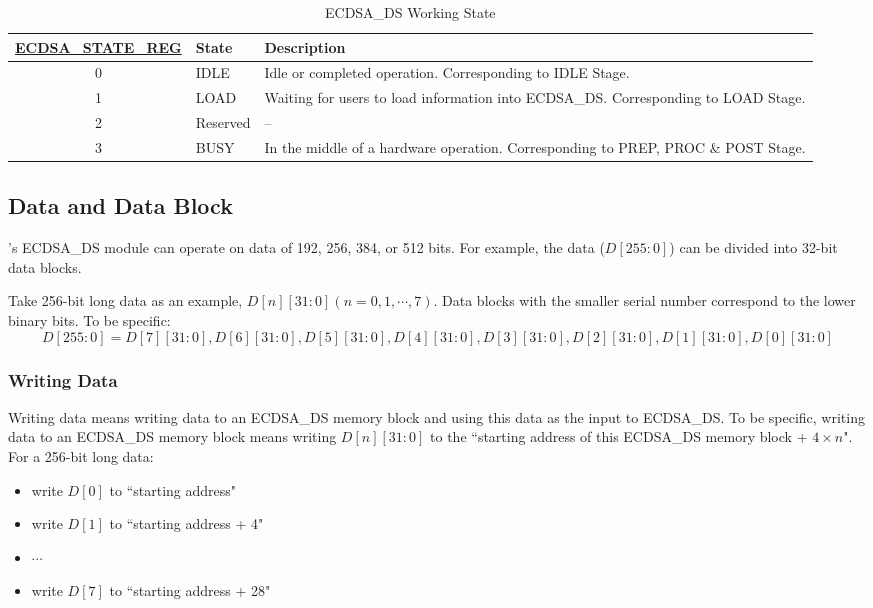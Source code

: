 \documentclass[main\_\_EN.tex]{subfiles}
\begin{document}
\begin{table}[H]
    \centering
    \caption{ECDSA\_DS Working State}
    \label{tab:ecdsa-working-state}
    \begin{tabular}{ | c | l | L{8cm} | }
    \hline
        \textbf{\hyperref[regdesc:ECDSASTATEREG]{ECDSA\_STATE\_REG}} & \textbf{State} &  \textbf{Description} \\     & IDLE      &   Idle or completed operation. Corresponding to IDLE Stage.\\     & LOAD      &   Waiting for users to load information into ECDSA\_DS. Corresponding to LOAD Stage.    \\     & Reserved      &  --    \\     & BUSY      &   In the middle of a hardware operation. Corresponding to PREP, PROC \& POST Stage.    \\ \hline
    \end{tabular}
\end{table}

\subsection{Data and Data Block}

\chipname{}'s ECDSA\_DS module can operate on data of 192, 256, 384, or 512 bits. For example, the data ($D[255:0]$) can be divided into 32-bit data blocks.

Take 256-bit long data as an example, $D[n][31:0] (n=0, 1, \cdots, 7)$. Data blocks with the smaller serial number correspond to the lower binary bits. To be specific:
\[
D[255:0] = {D[7][31:0],D[6][31:0],D[5][31:0],
D[4][31:0],D[3][31:0],D[2][31:0],D[1][31:0],D[0][31:0]}
\]

\subsubsection{Writing Data}

Writing data means writing data to an ECDSA\_DS memory block and using this data as the input to ECDSA\_DS. To be specific, writing data to an ECDSA\_DS memory block means writing $D[n][31:0]$ to the ``starting address of this ECDSA\_DS memory block + $4 \times n$".
For a 256-bit long data:
\begin{itemize}
    \item write $D[0]$ to ``starting address"
    \item write $D[1]$ to ``starting address + 4"
    \item $\cdots$
    \item write $D[7]$ to ``starting address + 28"
\end{itemize}
\end{document}

